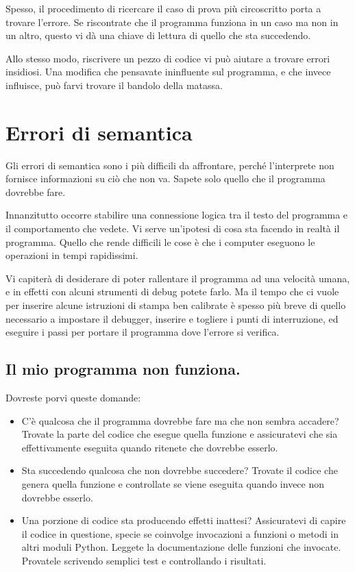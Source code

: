\documentclass[10pt]{book}
\begin{document}
Spesso, il procedimento di ricercare il caso di prova più circoscritto porta a trovare l'errore. Se riscontrate che il programma funziona in un caso ma non in un altro, questo vi dà una chiave di lettura di quello che sta succedendo.

Allo stesso modo, riscrivere un pezzo di codice vi può aiutare a trovare errori insidiosi. Una modifica che pensavate ininfluente sul programma, e che invece influisce, può farvi trovare il bandolo della matassa.


\section{Errori di semantica}

Gli errori di semantica sono i più difficili da affrontare, perché l'interprete non fornisce informazioni su ciò che non va. Sapete solo quello che il programma dovrebbe fare.

Innanzitutto occorre stabilire una connessione logica tra il testo del programma e il comportamento che vedete. Vi serve un'ipotesi di cosa sta facendo in realtà il programma. Quello che rende difficili le cose è che i computer eseguono le operazioni in tempi rapidissimi. 

Vi capiterà di desiderare di poter rallentare il programma ad una velocità umana, e in effetti con alcuni strumenti di debug potete farlo. Ma il tempo che ci vuole per inserire alcune istruzioni di stampa ben calibrate è spesso più breve di quello necessario a impostare il debugger, inserire e togliere i punti di interruzione, ed eseguire i passi per portare il programma dove l'errore si verifica.

\subsection{Il mio programma non funziona.}

Dovreste porvi queste domande:

\begin{itemize}

\item C'è qualcosa che il programma dovrebbe fare ma che non sembra accadere? Trovate la parte del codice che esegue quella funzione e assicuratevi che sia effettivamente eseguita quando ritenete che dovrebbe esserlo.

\item Sta succedendo qualcosa che non dovrebbe succedere? Trovate il codice che genera quella funzione e controllate se viene eseguita quando invece non dovrebbe esserlo.

\item Una porzione di codice sta producendo effetti inattesi? Assicuratevi di capire il codice in questione, specie se coinvolge invocazioni a funzioni o metodi in altri moduli Python. Leggete la documentazione delle funzioni che invocate. Provatele scrivendo semplici test e controllando i risultati.

\end{itemize}
\end{document}
